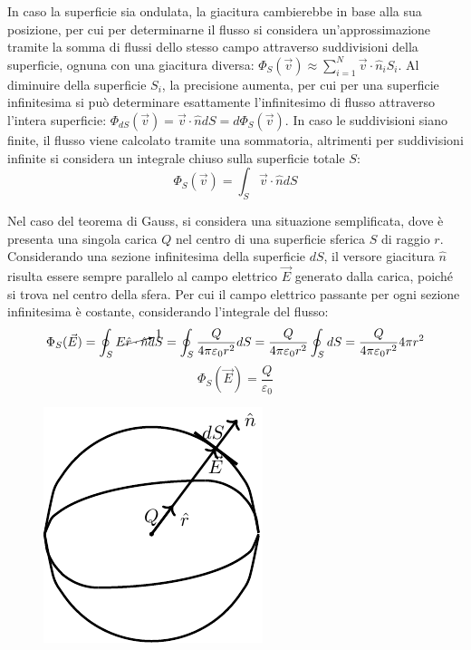 \documentclass{article}
\numberwithin{equation}{subsection}
\begin{document}
In caso la superficie sia ondulata, la giacitura cambierebbe in base alla sua posizione, per cui per determinarne il flusso si considera un'approssimazione tramite la somma 
di flussi dello stesso campo attraverso suddivisioni della superficie, ognuna con una giacitura diversa: 
$\Phi_S(\vec{v})\approx\sum_{i=1}^N\vec{v}\cdot\hat{n}_iS_i$. Al diminuire della superficie $S_i$, la precisione aumenta, per cui per una superficie infinitesima si può 
determinare esattamente l'infinitesimo di flusso attraverso l'intera superficie: $\Phi_{dS}(\vec{v})=\vec{v}\cdot\hat{n}dS=d\Phi_{S}(\vec{v})$. In caso le suddivisioni 
siano finite, il flusso viene calcolato tramite una sommatoria, altrimenti per suddivisioni infinite si considera un integrale chiuso sulla superficie totale $S$:
\begin{equation}
    \displaystyle\Phi_S(\vec{v})=\int_{S}\vec{v}\cdot\hat{n}dS
\end{equation}




Nel caso del teorema di Gauss, si considera una situazione semplificata, dove è presenta una singola carica $Q$ nel centro di una superficie sferica $S$ di raggio $r$. 
Considerando una sezione infinitesima della superficie $dS$, il versore giacitura $\hat{n}$ risulta essere sempre parallelo al campo elettrico $\vec{E}$ generato dalla carica, 
poiché si trova nel centro della sfera. Per cui il campo elettrico passante per ogni sezione infinitesima è costante, considerando l'integrale del flusso: 
\begin{gather*}
    \Phi_S(\vec{E})=\displaystyle\oint_{S}E\cancelto{1}{\hat{r}\cdot\hat{n}}dS=\oint_S\frac{Q}{4\pi\varepsilon_0r^2}dS=\frac{Q}{4\pi\varepsilon_0r^2}\oint_SdS=\frac{Q}{4\pi\varepsilon_0r^2}4\pi r^2
\end{gather*} 
\begin{equation}
    \Phi_S(\vec{E})=\frac{Q}{\varepsilon_0}
\end{equation}
\begin{figure}[H]%
    \centering
    \includegraphics{teorema-gauss.pdf}%
    \label{fig:teorema-gauss}
\end{figure}
\end{document}
